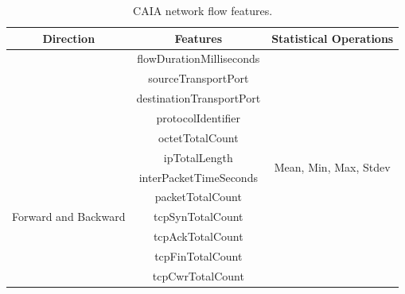 \documentclass[conference]{IEEEtran}
\begin{document}
\begin{table}[ht!]
	
	\centering
	\caption{CAIA network flow features.}
	\label{tab:cres}
	     
	\footnotesize
	\begin{tabular}{|c|c|c|}
		\toprule
		\textbf{Direction}                    & \textbf{Features}        & \textbf{Statistical Operations}        \\
		\midrule
		    
		                                      & flowDurationMilliseconds &                                        \\
		                                      & sourceTransportPort      &                                        \\
		                                      & destinationTransportPort &                                        \\
		                                      & protocolIdentifier       &                                        \\
		                                      & octetTotalCount          &                                        \\
		\midrule
		\multirow{7}{*}{Forward and Backward} & ipTotalLength            & \multirow{2}{*}{Mean, Min, Max, Stdev} \\
		                                      & interPacketTimeSeconds   &                                        \\
		\cmidrule{2-3}
		                                      & packetTotalCount         &                                        \\
		                                      & tcpSynTotalCount         &                                        \\
		                                      & tcpAckTotalCount         &                                        \\
		                                      & tcpFinTotalCount         &                                        \\
		                                      & tcpCwrTotalCount         &                                        \\
		   
		\midrule
		
		
	\end{tabular}
		
\end{table}
\end{document}
